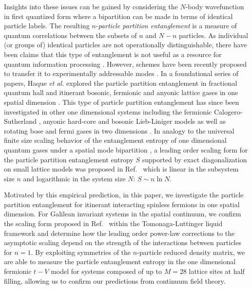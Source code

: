 Insights into these issues can be gained by considering the $N$-body
wavefunction in first quantized form  where a bipartition can be made in terms
of identical particle labels.  The resulting $n$-\emph{particle partition
entanglement} is a measure of quantum correlations between the subsets of $n$
and $N-n$ particles.  As individual (or groups of) identical
particles are not operationally distinguishable, there have been claims that
this type of entanglement is not useful as a resource for quantum information
processing \cite{Ghirardi:2004dl,Tichy:2011je,Balachandran:2013en}.  However,
schemes have been recently proposed to transfer it to experimentally
addressable modes \cite{Killoran:2014gu}.  In a foundational series of papers,
Haque \emph{et al.} explored the particle partition entanglement
in fractional quantum hall \cite{Zozulya:2007jw,Haque:2007il} and itinerant
bosonic, fermionic and anyonic lattice gases in one spatial dimension
\cite{Zozulya:2008kb,Haque:2009df}.  This type of particle partition
entanglement has since been investigated in other one dimensional systems
including the fermionic Calogero-Sutherland \cite{Katsura:2007hc}, anyonic
hard-core \cite{Santachiara:2007il} and bosonic Lieb-Liniger 
\cite{Herdman:2014jq, Herdman:2015gx} models
as well as rotating bose and fermi gases in two dimensions
\cite{Liu:2010pe}.  In analogy to the universal finite size scaling behavior of
the entanglement entropy of one dimensional quantum gases under a spatial
mode bipartition \cite{Calabrese:2004hl, Calabrese:2011fj,
Calabrese:2011ji}, a leading order scaling form for the particle partition
entanglement entropy $S$ supported by exact diagonalization on small lattice
models was proposed in Ref.~\cite{Zozulya:2008kb}  which is linear in the
subsystem size $n$ and logarithmic in the system size $N$: $S \sim n \ln N$.

Motivated by this empirical prediction, in this paper, we investigate the particle
partition entanglement for itinerant interacting spinless fermions in one
spatial dimension.  For Galilean invariant systems in the spatial continuum, we
confirm the scaling form proposed in Ref.~\cite{Zozulya:2008kb} within the
Tomonaga-Luttinger liquid framework \cite{Tomonaga1951, Haldane1981}
and determine how the leading order power-law corrections to the asymptotic
scaling depend on the strength of the interactions between particles for $n=1$.
By exploiting symmetries of the $n$-particle reduced density matrix, we are
able to measure the particle entanglement entropy in the one dimensional
fermionic $t-V$ model for systems composed of up to $M=28$ lattice sites at
half filling, allowing us to confirm our predictions from continuum field
theory. 

